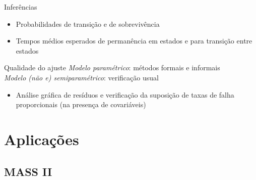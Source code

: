\begin{frame}

\begin{block}{Inferências}
 \begin{itemize}
  \pause \item Probabilidades de transição e de sobrevivência
\vspace{.15cm}
  \pause \item Tempos médios esperados de permanência em estados e para
               transição entre estados
 \end{itemize}
\end{block}\vspace{.2cm}

\pause

\begin{block}{Qualidade do ajuste}
 \pause \textit{Modelo paramétrico}: métodos formais e informais \\
\vspace{.15cm}
 \pause \textit{Modelo (não e) semiparamétrico}: verificação usual
 \begin{itemize}
  \pause \item Análise gráfica de resíduos e verificação da suposição de
               taxas de falha proporcionais (na presença de covariáveis)
 \end{itemize}
\end{block}

\end{frame}

\section{Aplicações}\label{aplicacoes}

\subsection{MASS II}\label{mass-ii}

